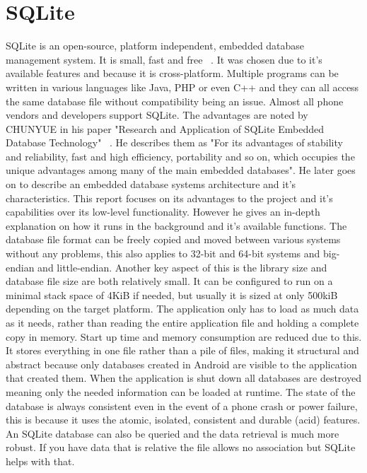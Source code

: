 \section{SQLite}
SQLite is an open-source, platform independent, embedded database management system. It is small, fast and free ~\cite{sqlite}. It was chosen due to it's available features and because it is cross-platform. Multiple programs can be written in various languages like Java, PHP or even C++ and they can all access the same database file without compatibility being an issue. Almost all phone vendors and developers support SQLite. The advantages are noted by CHUNYUE in his paper "Research and Application of SQLite Embedded Database Technology" ~\cite{bi}. He describes them as "For its advantages of stability and reliability, fast and high efficiency, portability and so on, which occupies the unique advantages among many of the main embedded databases". He later goes on to describe an embedded database systems architecture and it's characteristics. This report focuses on its advantages to the project and it's capabilities over its low-level functionality. However he gives an in-depth explanation on how it runs in the background and it's available functions.
The database file format can be freely copied and moved between various systems without any problems, this also applies to 32-bit and 64-bit systems and big-endian and little-endian. Another key aspect of this is the library size and database file size are both relatively small. It can be configured to run on a minimal stack space of 4KiB if needed, but usually it is sized at only 500kiB depending on the target platform. The application only has to load as much data as it needs, rather than reading the entire application file and holding a complete copy in memory. Start up time and memory consumption are reduced due to this. It stores everything in one file rather than a pile of files, making it structural and abstract because only databases created in Android are visible to the application that created them. When the application is shut down all databases are destroyed meaning only the needed information can be loaded at runtime. The state of the database is always consistent even in the event of a phone crash or power failure, this is because it uses the atomic, isolated, consistent and durable (acid) features. An SQLite database can also be queried and the data retrieval is much more robust. If you have data that is relative the file allows no association but SQLite helps with that.

\pagebreak
